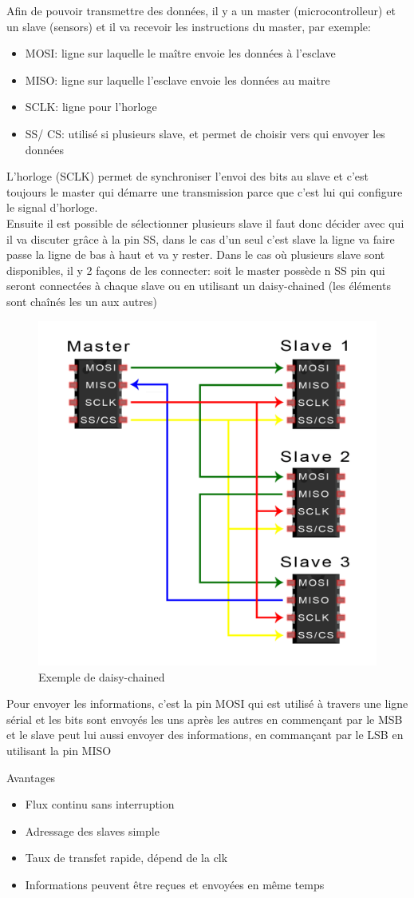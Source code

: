 Afin de pouvoir transmettre des données, il y a un master (microcontrolleur) et un slave (sensors) et il va recevoir les instructions du master, par exemple:
\begin{itemize}
   \item MOSI: ligne sur laquelle le maître envoie les données à l'esclave
   \item MISO: ligne sur laquelle l'esclave envoie les données au maitre
   \item SCLK: ligne pour l'horloge
   \item SS/ CS: utilisé si plusieurs slave, et permet de choisir vers qui envoyer les données
\end{itemize}
L'horloge (SCLK) permet de synchroniser l'envoi des bits au slave et c'est toujours le master qui démarre une transmission parce que c'est lui qui configure le signal d'horloge.\\
Ensuite il est possible de sélectionner plusieurs slave il faut donc décider avec qui il va discuter grâce à la pin SS, dans le cas d'un seul c'est slave la ligne va faire passe la ligne de bas à haut et va y rester. Dans le cas où plusieurs slave sont disponibles, il y 2 façons de les connecter: soit le master possède n SS pin qui seront connectées à chaque slave ou en utilisant un daisy-chained (les éléments sont chaînés les un aux autres) 
\begin{figure}[h!]
   \centering
   \includegraphics[width=.4\textwidth]{images/daisychained.png}
   \caption{Exemple de daisy-chained}
\end{figure}
Pour envoyer les informations, c'est la pin MOSI qui est utilisé à travers une ligne sérial et les bits sont envoyés les uns après les autres en commençant par le MSB et le slave peut lui aussi envoyer des informations, en commançant par le LSB en utilisant la pin MISO

Avantages
\begin{itemize}
   \item Flux continu sans interruption
   \item Adressage des slaves simple
   \item Taux de transfet rapide, dépend de la clk
   \item Informations peuvent être reçues et envoyées en même temps 
\end{itemize}


